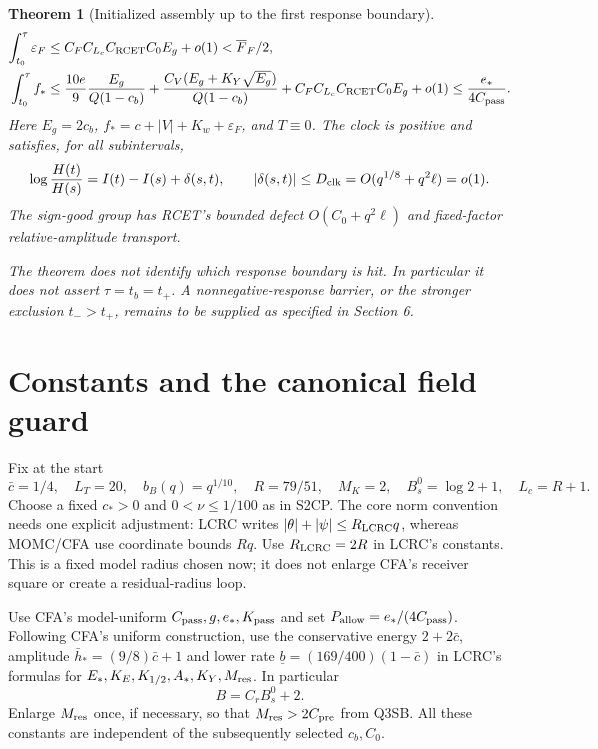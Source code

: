 \documentclass[11pt]{article}
\newtheorem{theorem}{Theorem}[section]
\theoremstyle{remark}\newtheorem{remark}[theorem]{Remark}
\newcommand{\eps}{\varepsilon}
\begin{document}
\begin{theorem}[Initialized assembly up to the first response boundary]
\begin{align}
 \int_{t_0}^\tau\eps_F
 &\le C_FC_{L_c}C_{\rm RCET}C_0E_g+o(1)
        <\overline F_F/2,
 \label{an03wptv1:field}\\
 \int_{t_0}^\tau f_*
 &\le\frac{10e}{9}\frac{E_g}{Q(1-c_b)}
  +\frac{C_V(E_g+K_Y\sqrt{E_g})}{Q(1-c_b)}
  +C_FC_{L_c}C_{\rm RCET}C_0E_g+o(1)
  \le\frac{e_*}{4C_{\rm pass}}.
 \label{an03wptv1:forcing}
\end{align}
Here $E_g=2c_b$, $f_*=c+|V|+K_w+\eps_F$, and $T\equiv0$.
The clock is positive and satisfies, for all subintervals,
\begin{equation}
 \log\frac{H(t)}{H(s)}=I(t)-I(s)+\delta(s,t),\qquad
 |\delta(s,t)|\le D_{\rm clk}
 =O(q^{1/8}+q^2\ell)=o(1).
 \label{an03wptv1:clock}
\end{equation}
The sign-good group has RCET's bounded defect
$O(C_0+q^2\ell)$ and fixed-factor relative-amplitude transport.

The theorem does not identify which response boundary is hit.
In particular it does not assert $\tau=t_b=t_+$. A nonnegative-response
barrier, or the stronger exclusion $t_->t_+$, remains to be supplied
as specified in Section 6.
\end{theorem}

\section{Constants and the canonical field guard}
Fix at the start
\begin{equation}
 \bar c=1/4,\quad L_T=20,\quad b_B(q)=q^{1/10},\quad
 R=79/51,\quad M_K=2,\quad B_s^0=\log2+1,
 \quad L_c=R+1.
 \label{an03wptv1:firstconstants}
\end{equation}
Choose a fixed $c_*>0$ and $0<\nu\le1/100$ as in S2CP.
The core norm convention needs one explicit adjustment: LCRC writes
$|\theta|+|\psi|\le R_{\rm LCRC}q$, whereas MOMC/CFA use
coordinate bounds $Rq$. Use $R_{\rm LCRC}=2R$ in LCRC's
constants. This is a fixed model radius chosen now; it does not
enlarge CFA's receiver square or create a residual-radius loop.

Use CFA's model-uniform $C_{\rm pass},g,e_*,K_{\rm pass}$ and set
$P_{\rm allow}=e_*/(4C_{\rm pass})$. Following CFA's uniform
construction, use the conservative energy $2+2\bar c$, amplitude
$\bar h_*=(9/8)\bar c+1$ and lower rate
$\underline b=(169/400)(1-\bar c)$ in LCRC's formulas for
$E_*,K_E,K_{1/2},A_*,K_Y,M_{\rm res}$. In particular
\[
 B=C_rB_s^0+2.
\]
Enlarge $M_{\rm res}$ once, if necessary, so that
$M_{\rm res}>2C_{\rm pre}$ from Q3SB. All these constants are
independent of the subsequently selected $c_b,C_0$.
\end{document}
